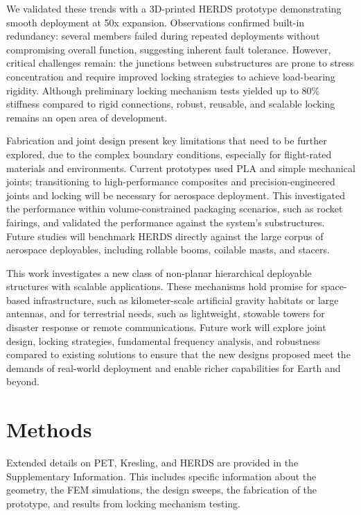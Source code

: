 {We validated these trends with a 3D-printed HERDS prototype demonstrating smooth deployment at 50x expansion. Observations confirmed built-in redundancy: several members failed during repeated deployments without compromising overall function, suggesting inherent fault tolerance. However, critical challenges remain: the junctions between substructures are prone to stress concentration and require improved locking strategies to achieve load-bearing rigidity. Although preliminary locking mechanism tests yielded up to 80\% stiffness compared to rigid connections, robust, reusable, and scalable locking remains an open area of development.}

{Fabrication and joint design present key limitations that need to be further explored, due to the complex boundary conditions, especially for flight-rated materials and environments. Current prototypes used PLA and simple mechanical joints; transitioning to high-performance composites and precision-engineered joints and locking will be necessary for aerospace deployment. This investigated the performance within volume-constrained packaging scenarios, such as rocket fairings, and validated the performance against the system's substructures. Future studies will benchmark HERDS directly against the large corpus of aerospace deployables, including rollable booms, coilable masts, and stacers.}

{This work investigates a new class of non-planar hierarchical deployable structures with scalable applications. These mechanisms hold promise for space-based infrastructure, such as kilometer-scale artificial gravity habitats or large antennas, and for terrestrial needs, such as lightweight, stowable towers for disaster response or remote communications. Future work will explore joint design, locking strategies, fundamental frequency analysis, and robustness compared to existing solutions to ensure that the new designs proposed meet the demands of real-world deployment and enable richer capabilities for Earth and beyond.
}

\section{Methods}
Extended details on PET, Kresling, and HERDS are provided in the Supplementary Information. This includes specific information about the geometry, the FEM simulations, the design sweeps, the fabrication of the prototype, and results from locking mechanism testing. 
\backmatter




